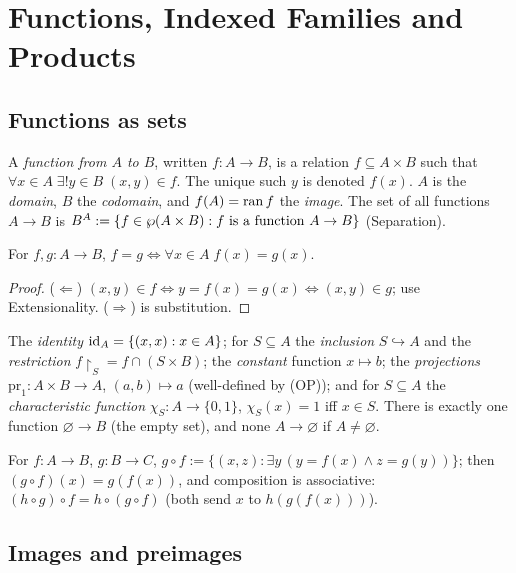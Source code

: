 \chapter{Functions, Indexed Families and Products}\label{ch:functions}

\section{Functions as sets}

\begin{definition}[Function]
	A \emph{function from $A$ to $B$}, written $f:A\to B$, is a relation $f\subseteq A\times B$ such that $\forall x\in A\;\exists!y\in B\;(x,y)\in f$. The unique such $y$ is denoted $f(x)$. $A$ is the \emph{domain}, $B$ the \emph{codomain}, and $f(A)=\operatorname{ran} f$ the \emph{image}. The set of all functions $A\to B$ is $B^A:=\{f\in\wp(A\times B):f\text{ is a function }A\to B\}$ (Separation).
\end{definition}

\begin{proposition}
	For $f,g:A\to B$, $f=g\iff\forall x\in A\;f(x)=g(x)$.
\end{proposition}
\begin{proof}
	($\Leftarrow$) $(x,y)\in f\iff y=f(x)=g(x)\iff(x,y)\in g$; use Extensionality. ($\Rightarrow$) is substitution.
\end{proof}

\begin{example}
	The \emph{identity} $\operatorname{id}_A=\{(x,x):x\in A\}$; for $S\subseteq A$ the \emph{inclusion} $S\hookrightarrow A$ and the \emph{restriction} $f{\restriction}_S=f\cap(S\times B)$; the \emph{constant} function $x\mapsto b$; the \emph{projections} $\mathrm{pr}_1:A\times B\to A$, $(a,b)\mapsto a$ (well-defined by (OP)); and for $S\subseteq A$ the \emph{characteristic function} $\chi_S:A\to\{0,1\}$, $\chi_S(x)=1$ iff $x\in S$. There is exactly one function $\varnothing\to B$ (the empty set), and none $A\to\varnothing$ if $A\neq\varnothing$.
\end{example}

\begin{definition}[Composition]
	For $f:A\to B$, $g:B\to C$, $g\circ f:=\{(x,z):\exists y\,(y=f(x)\wedge z=g(y))\}$; then $(g\circ f)(x)=g(f(x))$, and composition is associative: $(h\circ g)\circ f=h\circ(g\circ f)$ (both send $x$ to $h(g(f(x)))$).
\end{definition}

\section{Images and preimages}

